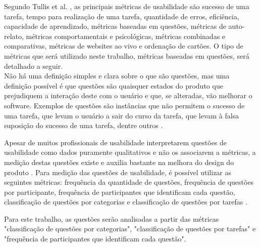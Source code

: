 	Segundo Tullis et al. \cite{tullis:13}, as principais métricas de usabilidade são sucesso de uma tarefa, tempo para realização de uma tarefa, quantidade de erros, eficiência, capacidade de aprendizado, métricas baseadas em questões, métricas de auto-relato, métricas comportamentais e psicológicas, métricas combinadas e comparativas, métricas de websites ao vivo e ordenação de cartões. O tipo de métricas que será utilizado neste trabalho, métricas baseadas em questões, será detalhado a seguir.
\\

    Não há uma definição simples e clara sobre o que são questões, mas uma definição possível é que questões são quaisquer estados do produto que prejudiquem a interação deste com o usuário e que, se alteradas, vão melhorar o software. Exemplos de questões são instâncias que não permitem o sucesso de uma tarefa, que levam o usuário a sair do curso da tarefa, que levam à falsa suposição do sucesso de uma tarefa, dentre outros \cite{tullis:13}.

    Apesar de muitos profissionais de usabilidade interpretarem questões de usabilidade como dados puramente qualitativos e não os associarem a métricas, a medição destas questões existe e auxilia bastante na melhora do design do produto \cite{tullis:13}. Para medição das questões de usabilidade, é possível utilizar as seguintes métricas: frequência da quantidade de questões, frequência de questões por participante, frequência de participantes que identificam cada questão, classificação de questões por categorias e classificação de questões por tarefas \cite{tullis:13}.

Para este trabalho, as questões serão analisadas a partir das métricas "classificação de questões por categorias", "classificação de questões por tarefas" e "frequência de participantes que identificam cada questão".



